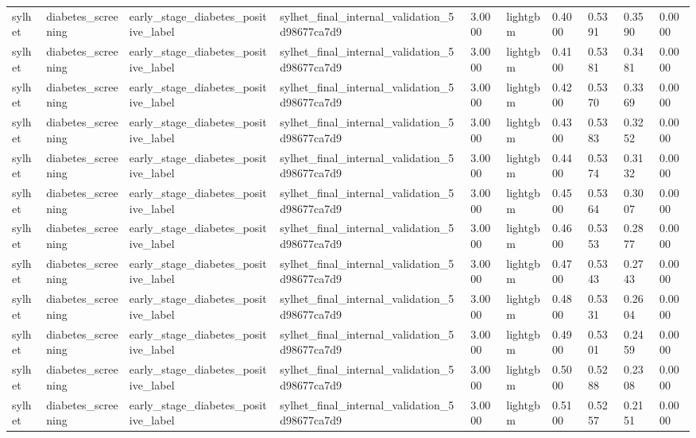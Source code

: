 \begin{tabular}{llllllllll}
sylhet & diabetes\_screening & early\_stage\_diabetes\_positive\_label & sylhet\_final\_internal\_validation\_5d98677ca7d9 & 3.0000 & lightgbm & 0.4000 & 0.5391 & 0.3590 & 0.0000 \\
sylhet & diabetes\_screening & early\_stage\_diabetes\_positive\_label & sylhet\_final\_internal\_validation\_5d98677ca7d9 & 3.0000 & lightgbm & 0.4100 & 0.5381 & 0.3481 & 0.0000 \\
sylhet & diabetes\_screening & early\_stage\_diabetes\_positive\_label & sylhet\_final\_internal\_validation\_5d98677ca7d9 & 3.0000 & lightgbm & 0.4200 & 0.5370 & 0.3369 & 0.0000 \\
sylhet & diabetes\_screening & early\_stage\_diabetes\_positive\_label & sylhet\_final\_internal\_validation\_5d98677ca7d9 & 3.0000 & lightgbm & 0.4300 & 0.5383 & 0.3252 & 0.0000 \\
sylhet & diabetes\_screening & early\_stage\_diabetes\_positive\_label & sylhet\_final\_internal\_validation\_5d98677ca7d9 & 3.0000 & lightgbm & 0.4400 & 0.5374 & 0.3132 & 0.0000 \\
sylhet & diabetes\_screening & early\_stage\_diabetes\_positive\_label & sylhet\_final\_internal\_validation\_5d98677ca7d9 & 3.0000 & lightgbm & 0.4500 & 0.5364 & 0.3007 & 0.0000 \\
sylhet & diabetes\_screening & early\_stage\_diabetes\_positive\_label & sylhet\_final\_internal\_validation\_5d98677ca7d9 & 3.0000 & lightgbm & 0.4600 & 0.5353 & 0.2877 & 0.0000 \\
sylhet & diabetes\_screening & early\_stage\_diabetes\_positive\_label & sylhet\_final\_internal\_validation\_5d98677ca7d9 & 3.0000 & lightgbm & 0.4700 & 0.5343 & 0.2743 & 0.0000 \\
sylhet & diabetes\_screening & early\_stage\_diabetes\_positive\_label & sylhet\_final\_internal\_validation\_5d98677ca7d9 & 3.0000 & lightgbm & 0.4800 & 0.5331 & 0.2604 & 0.0000 \\
sylhet & diabetes\_screening & early\_stage\_diabetes\_positive\_label & sylhet\_final\_internal\_validation\_5d98677ca7d9 & 3.0000 & lightgbm & 0.4900 & 0.5301 & 0.2459 & 0.0000 \\
sylhet & diabetes\_screening & early\_stage\_diabetes\_positive\_label & sylhet\_final\_internal\_validation\_5d98677ca7d9 & 3.0000 & lightgbm & 0.5000 & 0.5288 & 0.2308 & 0.0000 \\
sylhet & diabetes\_screening & early\_stage\_diabetes\_positive\_label & sylhet\_final\_internal\_validation\_5d98677ca7d9 & 3.0000 & lightgbm & 0.5100 & 0.5257 & 0.2151 & 0.0000 \\

\end{tabular}

